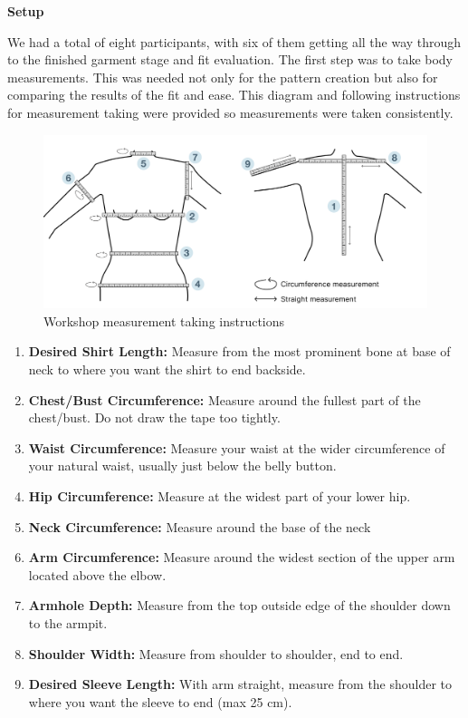 \noindent \textbf{Setup}

We had a total of eight participants, with six of them getting all the way through to the finished garment stage and fit evaluation.
\newline
The first step was to take body measurements. This was needed not only for the pattern creation but also for comparing the results of the fit and ease. This diagram and following instructions for measurement taking were provided so measurements were taken consistently.
\begin{figure} [H] %
    \centering %
    \includegraphics[width = \textwidth]{Images/Measurement Taking Guide.png} %
    \caption{Workshop measurement taking instructions}
\end{figure}
\begin{enumerate}
    \item \textbf{Desired Shirt Length:} Measure from the most prominent bone at base of neck to where you want the shirt to end backside.
    \item \textbf{Chest/Bust Circumference:} Measure around the fullest part of the chest/bust. Do not draw the tape too tightly.
    \item \textbf{Waist Circumference:} Measure your waist at the wider circumference of your natural waist, usually just below the belly button.
    \item \textbf{Hip Circumference:} Measure at the widest part of your lower hip.
    \item \textbf{Neck Circumference:} Measure around the base of the neck
    \item \textbf{Arm Circumference:} Measure around the widest section of the upper arm located above the elbow.
    \item \textbf{Armhole Depth:} Measure from the top outside edge of the shoulder down to the armpit.
    \item \textbf{Shoulder Width:} Measure from shoulder to shoulder, end to end.
    \item \textbf{Desired Sleeve Length:} With arm straight, measure from the shoulder to where you want the sleeve to end (max 25 cm).
\end{enumerate}

